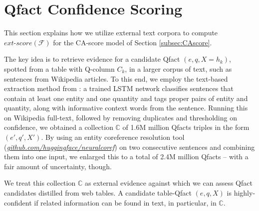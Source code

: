 \section{Qfact Confidence Scoring}
\label{sec:qfact_scoring_model}

This section explains how we utilize external text corpora to compute 
$\textit{ext-score}(\mathcal{F})$ for the CA-score model of Section \ref{subsec:CAscore}.

The key idea is to retrieve evidence for a candidate
Qfact $(e,q,X = h_k)$, spotted from a table with Q-column $C_k$,
in a larger corpus of text, such as sentences from
Wikipedia articles.
To this end, we employ the text-based extraction
method from \cite{DBLP:conf/semweb/HoIPBW19}: a trained LSTM network 
classifies sentences that contain at least one
entity and
one quantity and tags
proper pairs of entity and quantity,
along with informative context words from the
sentence. 
Running this on Wikipedia full-text, 
followed by removing duplicates and thresholding on confidence, we obtained a collection $\mathbb{C}$ of 1.6M million
Qfacts triples in the form $(e',q',X')$. By using an entity coreference resolution tool (\textit{\url{github.com/huggingface/neuralcoref}})
on two consecutive sentences and combining them
into one input, we enlarged this to a total
of 2.4M million Qfacts -- with a fair amount of
uncertainty, though. 

We treat this collection $\mathbb{C}$ as external evidence
against which we can assess Qfact
candidates distilled from web tables. 
A candidate table-Qfact $(e,q,X)$ is highly-confident if related information can be found in text, in particular, in $\mathbb{C}$.


